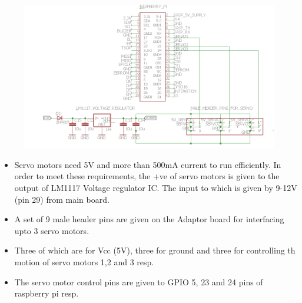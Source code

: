 \documentclass[a4paper,12pt,oneside]{book}
\begin{document}
\section*{\textbf{\fontsize{25}{10}\selectfont{9.Powering servo motors and Servo pod connections}}}
\begin{figure}[h]
	\includegraphics[width=1\textwidth]{servo}
\end{figure}
\hfill
\begin{itemize}
	\item {Servo motors need 5V and more than 500mA current to run efficiently. In order to meet these requirements, the +ve of servo motors is given to the output of LM1117 Voltage regulator IC. The input to which is given by 9-12V (pin 29) from main board.}
	\item {A set of 9 male header pins are given on the Adaptor board for interfacing upto 3 servo motors.}
	\item {Three of which are for Vcc (5V), three for ground and three for controlling th motion of servo motors 1,2 and 3 resp.}
	\item {The servo motor control pins are given to GPIO 5, 23 and 24 pins of raspberry pi resp. }
\end{itemize}
\pagebreak
\end{document}
